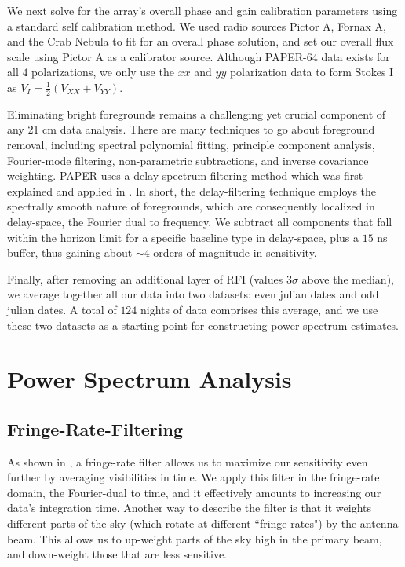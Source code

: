 \documentclass[preprint2,numberedappendix,tighten,twocolappendix]{aastex6}  %
\begin{document}
We next solve for the array's overall phase and gain calibration parameters using a standard self calibration method. We used radio sources Pictor A, Fornax A, and the Crab Nebula to fit for an overall phase solution, and set our overall flux scale using Pictor A as a calibrator source. Although PAPER-64 data exists for all $4$ polarizations, we only use the $xx$ and $yy$ polarization data to form Stokes I as $V_{I} = \frac{1}{2}(V_{XX} + V_{YY})$.

Eliminating bright foregrounds remains a challenging yet crucial component of any 21 cm data analysis. There are many techniques to go about foreground removal, including spectral polynomial fitting, principle component analysis, Fourier-mode filtering, non-parametric subtractions, and inverse covariance weighting. PAPER uses a delay-spectrum filtering method which was first explained and applied in \citet{parsons_et_al2014}. In short, the delay-filtering technique employs the spectrally smooth nature of foregrounds, which are consequently localized in delay-space, the Fourier dual to frequency. We subtract all components that fall within the horizon limit for a specific baseline type in delay-space, plus a $15$ ns buffer, thus gaining about $\sim4$ orders of magnitude in sensitivity. 

Finally, after removing an additional layer of RFI (values $3\sigma$ above the median), we average together all our data into two datasets: even julian dates and odd julian dates. A total of $124$ nights of data comprises this average, and we use these two datasets as a starting point for constructing power spectrum estimates.

\section{Power Spectrum Analysis}
\label{sec:PS}

\subsection{Fringe-Rate-Filtering}
\label{sec:FRF}

As shown in \citet{parsons_et_al2016}, a fringe-rate filter allows us to maximize our sensitivity even further by averaging visibilities in time. We apply this filter in the fringe-rate domain, the Fourier-dual to time, and it effectively amounts to increasing our data's integration time. Another way to describe the filter is that it weights different parts of the sky (which rotate at different ``fringe-rates") by the antenna beam. This allows us to up-weight parts of the sky high in the primary beam, and down-weight those that are less sensitive.
\end{document}
